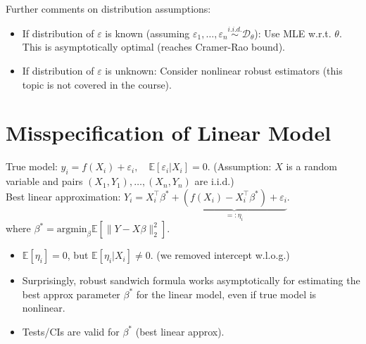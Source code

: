 Further comments on distribution assumptions:
\begin{itemize}
    \item If distribution of $\varepsilon$ is known (assuming $\varepsilon_1, \dots, \varepsilon_n \overset{i.i.d.}{\sim} \mathcal{D}_\theta$):
    Use MLE w.r.t. $\theta$. This is asymptotically optimal (reaches Cramer-Rao bound).
    \item If distribution of $\varepsilon$ is unknown:
    Consider nonlinear robust estimators (this topic is not covered in the course).
\end{itemize}

\section{Misspecification of Linear Model}
True model: $y_i = f(X_i) + \varepsilon_i, \quad \mathbb{E}[\varepsilon_i|X_i] = 0$.
(Assumption: $X$ is a random variable and pairs $(X_1, Y_1), \dots, (X_n, Y_n)$ are i.i.d.)
\\ Best linear approximation: $Y_i = X_i^\top \beta^* + \underbrace{(f(X_i) - X_i^\top \beta^*) + \varepsilon_i}_{=:\eta_i}$.
\\ where $\beta^* = \text{argmin}_\beta \mathbb{E}[\|Y - X\beta\|_2^2]$.
\begin{itemize}
    \item $\mathbb{E}[\eta_i]=0$, but $\mathbb{E}[\eta_i|X_i] \neq 0$. (we removed intercept w.l.o.g.)
    \item Surprisingly, robust sandwich formula works asymptotically for estimating the best approx parameter $\beta^*$ for the linear model, even if true model is nonlinear.
    \item Tests/CIs are valid for $\beta^*$ (best linear approx).
\end{itemize}

